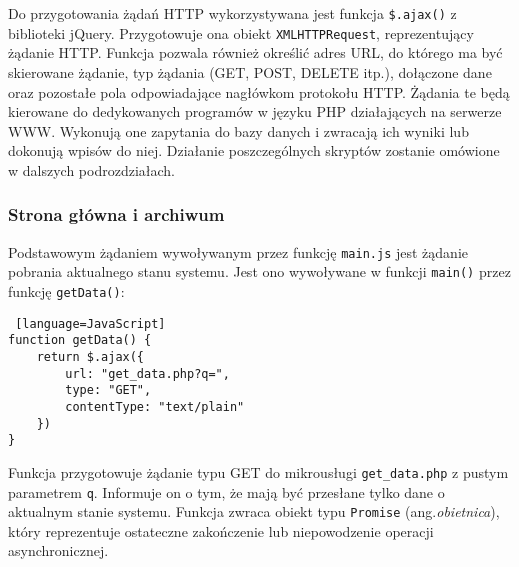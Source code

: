\documentclass[a4paper,11pt,twoside]{article}
\begin{document}
Do przygotowania żądań HTTP wykorzystywana jest funkcja \texttt{\$.ajax()} z biblioteki jQuery. Przygotowuje ona obiekt \texttt{XMLHTTPRequest}, reprezentujący żądanie HTTP. Funkcja pozwala również określić adres URL, do którego ma być skierowane żądanie, typ żądania (GET, POST, DELETE itp.), dołączone dane oraz pozostałe pola odpowiadające nagłówkom protokołu HTTP. Żądania te będą kierowane do dedykowanych programów w języku PHP działających na serwerze WWW. Wykonują one zapytania do bazy danych i zwracają ich wyniki lub dokonują wpisów do niej. Działanie poszczególnych skryptów zostanie omówione w dalszych podrozdziałach.

\subsubsection{Strona główna i archiwum}
Podstawowym żądaniem wywoływanym przez funkcję \texttt{main.js} jest żądanie pobrania aktualnego stanu systemu. Jest ono wywoływane w funkcji \texttt{main()} przez funkcję \texttt{getData()}:
\begin{lstlisting} [language=JavaScript]
function getData() {
    return $.ajax({
        url: "get_data.php?q=",
        type: "GET",
        contentType: "text/plain"
    })
}
\end{lstlisting}
Funkcja przygotowuje żądanie typu GET do mikrousługi \texttt{get{\_}data.php} z pustym parametrem \texttt{q}. Informuje on o tym, że mają być przesłane tylko dane o aktualnym stanie systemu. Funkcja zwraca obiekt typu \texttt{Promise} (ang.\textit{obietnica}), który reprezentuje ostateczne zakończenie lub niepowodzenie operacji asynchronicznej.\cite{promise} 
\end{document}
